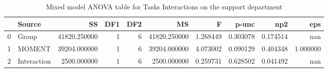 \begin{table}[h]
\centering
\caption{Mixed model ANOVA table for Tasks Interactions on the support department}
\label{tab:ANOVAMixedModelTasksSupport}
\begin{tabular}{llrrrrrrrr}
\toprule
 & Source & SS & DF1 & DF2 & MS & F & p-unc & np2 & eps \\
\midrule
0 & Group & 41820.250000 & 1 & 6 & 41820.250000 & 1.268449 & 0.303078 & 0.174514 & nan \\
1 & MOMENT & 39204.000000 & 1 & 6 & 39204.000000 & 4.073002 & 0.090129 & 0.404348 & 1.000000 \\
2 & Interaction & 2500.000000 & 1 & 6 & 2500.000000 & 0.259731 & 0.628502 & 0.041492 & nan \\
\bottomrule
\end{tabular}
\end{table}
